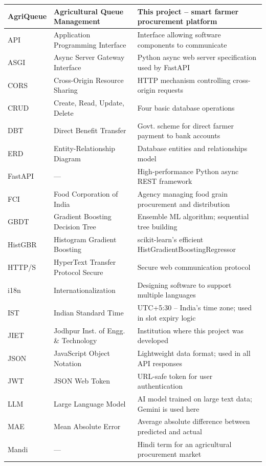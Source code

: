 \begin{longtable}{|>{\raggedright\arraybackslash}p{2.4cm}|>{\raggedright\arraybackslash}p{4.6cm}|>{\raggedright\arraybackslash}p{7.0cm}|}
AgriQueue & Agricultural Queue Management & This project -- smart farmer procurement platform \\ \hline
API & Application Programming Interface & Interface allowing software components to communicate \\ \hline
ASGI & Async Server Gateway Interface & Python async web server specification used by FastAPI \\ \hline
CORS & Cross-Origin Resource Sharing & HTTP mechanism controlling cross-origin requests \\ \hline
CRUD & Create, Read, Update, Delete & Four basic database operations \\ \hline
DBT & Direct Benefit Transfer & Govt. scheme for direct farmer payment to bank accounts \\ \hline
ERD & Entity-Relationship Diagram & Database entities and relationships model \\ \hline
FastAPI & --- & High-performance Python async REST framework \\ \hline
FCI & Food Corporation of India & Agency managing food grain procurement and distribution \\ \hline
GBDT & Gradient Boosting Decision Tree & Ensemble ML algorithm; sequential tree building \\ \hline
HistGBR & Histogram Gradient Boosting & scikit-learn's efficient HistGradientBoostingRegressor \\ \hline
HTTP/S & HyperText Transfer Protocol Secure & Secure web communication protocol \\ \hline
i18n & Internationalization & Designing software to support multiple languages \\ \hline
IST & Indian Standard Time & UTC+5:30 -- India's time zone; used in slot expiry logic \\ \hline
JIET & Jodhpur Inst. of Engg. \& Technology & Institution where this project was developed \\ \hline
JSON & JavaScript Object Notation & Lightweight data format; used in all API responses \\ \hline
JWT & JSON Web Token & URL-safe token for user authentication \\ \hline
LLM & Large Language Model & AI model trained on large text data; Gemini is used here \\ \hline
MAE & Mean Absolute Error & Average absolute difference between predicted and actual \\ \hline
Mandi & --- & Hindi term for an agricultural procurement market \\ \hline

\end{longtable}
